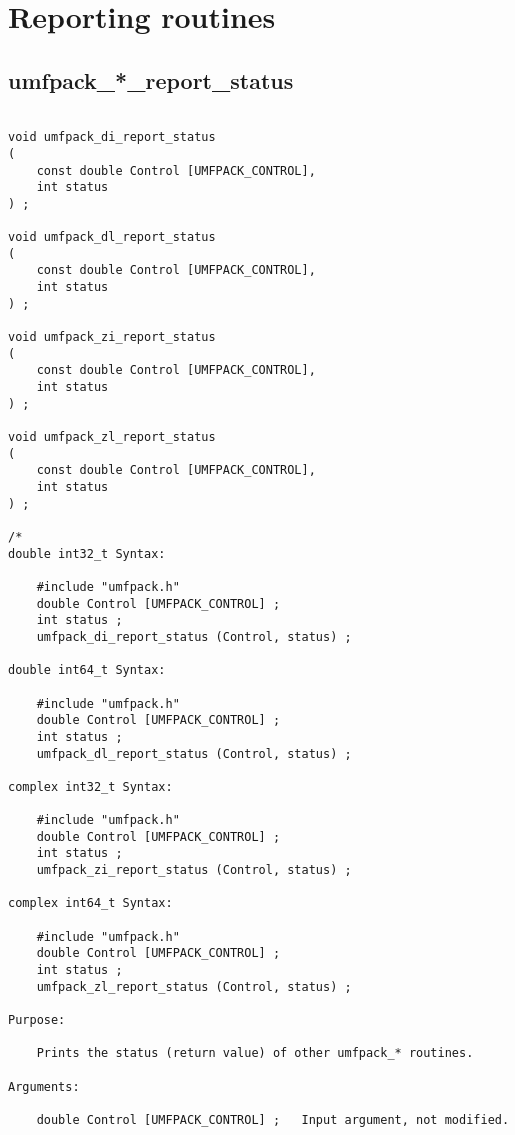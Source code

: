 \documentclass[11pt]{article}
\begin{document}
\newpage
\section{Reporting routines}
\label{Report}

\subsection{umfpack\_*\_report\_status}

{\footnotesize
\begin{verbatim}

void umfpack_di_report_status
(
    const double Control [UMFPACK_CONTROL],
    int status
) ;

void umfpack_dl_report_status
(
    const double Control [UMFPACK_CONTROL],
    int status
) ;

void umfpack_zi_report_status
(
    const double Control [UMFPACK_CONTROL],
    int status
) ;

void umfpack_zl_report_status
(
    const double Control [UMFPACK_CONTROL],
    int status
) ;

/*
double int32_t Syntax:

    #include "umfpack.h"
    double Control [UMFPACK_CONTROL] ;
    int status ;
    umfpack_di_report_status (Control, status) ;

double int64_t Syntax:

    #include "umfpack.h"
    double Control [UMFPACK_CONTROL] ;
    int status ;
    umfpack_dl_report_status (Control, status) ;

complex int32_t Syntax:

    #include "umfpack.h"
    double Control [UMFPACK_CONTROL] ;
    int status ;
    umfpack_zi_report_status (Control, status) ;

complex int64_t Syntax:

    #include "umfpack.h"
    double Control [UMFPACK_CONTROL] ;
    int status ;
    umfpack_zl_report_status (Control, status) ;

Purpose:

    Prints the status (return value) of other umfpack_* routines.

Arguments:

    double Control [UMFPACK_CONTROL] ;   Input argument, not modified.


\end{verbatim}}
\end{document}
